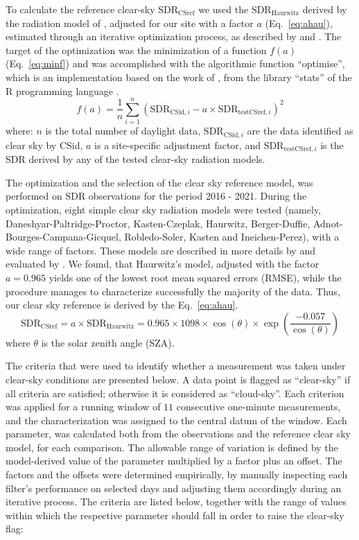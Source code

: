 \documentclass[applsci,article,submit,moreauthors,pdftex]{Definitions/mdpi}
\begin{document}
To calculate the reference clear-sky \(\text{SDR}_\text{CSref}\) we used
the \(\text{SDR}_\text{Haurwitz}\) derived by the radiation model of
\citet{Haurwitz1945}, adjusted for our site with a factor \(a\)
(Eq.~\ref{eq:ahau}), estimated through an iterative optimization
process, as described by \citet{Long2000} and \citet{Reno2016}. The
target of the optimization was the minimization of a function \(f(a)\)
(Eq.~\ref{eq:minf}) and was accomplished with the algorithmic function
``optimise'', which is an implementation based on the work of
\citet{Brent1973}, from the library ``stats'' of the R programming
language \citep{RCT2023}. \begin{equation}
f(a) = \frac{1}{n}\sum_{i=1}^{n} ( \text{SDR}_{\text{CSid},i} - a \times \text{SDR}_{\text{testCSref},i} )^2 \label{eq:minf}
\end{equation} where: \(n\) is the total number of daylight data,
\(\text{SDR}_{\text{CSid},i}\) are the data identified as clear sky by
CSid, \(a\) is a site-specific adjustment factor, and
\(\text{SDR}_{\text{testCSref},i}\) is the SDR derived by any of the
tested clear-sky radiation models.

The optimization and the selection of the clear sky reference model, was
performed on SDR observations for the period 2016 - 2021. During the
optimization, eight simple clear sky radiation models were tested
(namely, Daneshyar-Paltridge-Proctor, Kasten-Czeplak, Haurwitz,
Berger-Duffie, Adnot-Bourges-Campana-Gicquel, Robledo-Soler, Kasten and
Ineichen-Perez), with a wide range of factors. These models are
described in more details by \citet{Reno2012} and evaluated by
\citet{Reno2016}. We found, that Haurwitz's model, adjusted with the
factor \(a = 0.965\) yields one of the lowest root mean squared errors
(RMSE), while the procedure manages to characterize successfully the
majority of the data. Thus, our clear sky reference is derived by the
Eq.~\ref{eq:ahau}. \begin{equation}
\text{SDR}_\text{CSref} = a \times \text{SDR}_\text{Haurwitz} = 0.965 \times 1098 \times \cos(\theta) \times \exp \left( \frac{ - 0.057}{\cos(\theta)} \right) \label{eq:ahau}
\end{equation} where \(\theta\) is the solar zenith angle (SZA).

The criteria that were used to identify whether a measurement was taken
under clear-sky conditions are presented below. A data point is flagged
as ``clear-sky'' if all criteria are satisfied; otherwise it is
considered as ``cloud-sky''. Each criterion was applied for a running
window of \(11\) consecutive one-minute measurements, and the
characterization was assigned to the central datum of the window. Each
parameter, was calculated both from the observations and the reference
clear sky model, for each comparison. The allowable range of variation
is defined by the model-derived value of the parameter multiplied by a
factor plus an offset. The factors and the offsets were determined
empirically, by manually inspecting each filter's performance on
selected days and adjusting them accordingly during an iterative
process. The criteria are listed below, together with the range of
values within which the respective parameter should fall in order to
raise the clear-sky flag:
\end{document}
